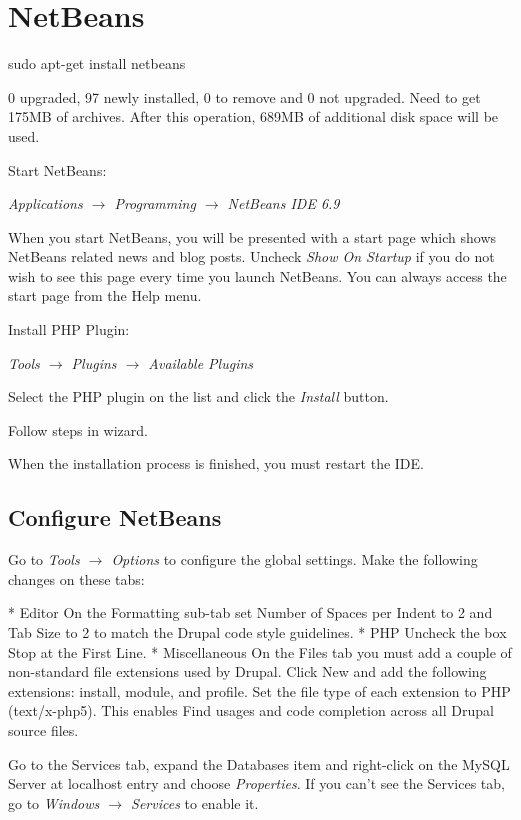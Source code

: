 \documentclass[draft,ebook,10pt,twoside,openright]{memoir}
\begin{document}
\section{NetBeans}

\begin{squashboxcommand}
sudo apt-get install netbeans
\end{squashboxcommand}

0 upgraded, 97 newly installed, 0 to remove and 0 not upgraded.
Need to get 175MB of archives.
After this operation, 689MB of additional disk space will be used.

Start NetBeans:

\emph{Applications $\rightarrow$ Programming $\rightarrow$ NetBeans IDE 6.9}

When you start NetBeans, you will be presented with a start page which shows NetBeans related news and blog posts. Uncheck \emph{Show On Startup} if you do not wish to see this page every time you launch NetBeans. You can always access the start page from the Help menu.

Install PHP Plugin:

\emph{Tools $\rightarrow$ Plugins $\rightarrow$ Available Plugins}

Select the PHP plugin on the list and click the \emph{Install} button.

Follow steps in wizard.

When the installation process is finished, you must restart the IDE.

\subsection{Configure NetBeans}

Go to \emph{Tools $\rightarrow$ Options} to configure the global settings. Make the following changes on these tabs:

    * Editor On the Formatting sub-tab set Number of Spaces per Indent to 2 and Tab Size to 2 to match the Drupal code style guidelines.
    * PHP Uncheck the box Stop at the First Line.
    * Miscellaneous On the Files tab you must add a couple of non-standard file extensions used by Drupal. Click New and add the following extensions: install, module, and profile. Set the file type of each extension to PHP (text/x-php5). This enables Find usages and code completion across all Drupal source files.

Go to the Services tab, expand the Databases item and right-click on the MySQL Server at localhost entry and choose \emph{Properties}. If you can’t see the Services tab, go to \emph{Windows $\rightarrow$ Services} to enable it.
\end{document}
